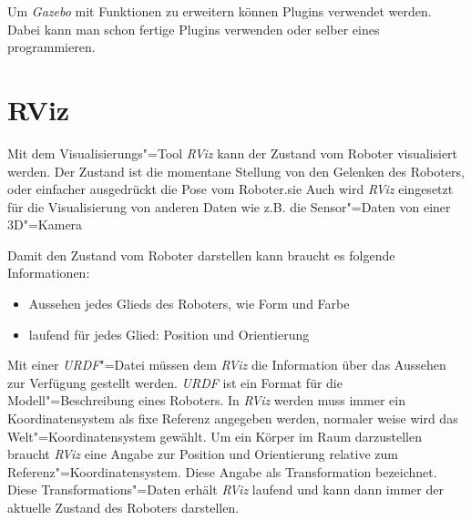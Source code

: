 Um \textit{Gazebo} mit Funktionen zu erweitern können Plugins verwendet werden.
Dabei kann man schon fertige Plugins verwenden oder selber eines programmieren. %

\section{RViz}
Mit dem Visualisierungs"=Tool \textit{RViz} kann der Zustand vom Roboter visualisiert werden.
Der Zustand ist die momentane Stellung von den Gelenken des Roboters, oder einfacher ausgedrückt die Pose vom Roboter.sie
Auch wird \textit{RViz} eingesetzt für die Visualisierung von anderen Daten wie z.B. die Sensor"=Daten von einer 3D"=Kamera

Damit  den Zustand vom Roboter darstellen kann braucht es folgende Informationen:
\begin{itemize}
\item Aussehen jedes Glieds des Roboters, wie Form und Farbe 
\item laufend für jedes Glied: Position und Orientierung
\end{itemize}

Mit einer \textit{URDF}"=Datei müssen dem \textit{RViz} die Information über das Aussehen zur Verfügung gestellt werden. %
\textit{URDF} ist ein Format für die Modell"=Beschreibung eines Roboters.
In \textit{RViz} werden muss immer ein Koordinatensystem als fixe Referenz angegeben werden, normaler weise wird das Welt"=Koordinatensystem gewählt.
Um ein Körper im Raum darzustellen braucht \textit{RViz} eine Angabe zur Position und Orientierung relative zum Referenz"=Koordinatensystem.
Diese Angabe als Transformation bezeichnet.
Diese Transformations"=Daten erhält \textit{RViz} laufend und kann dann immer der aktuelle Zustand des Roboters darstellen. %

